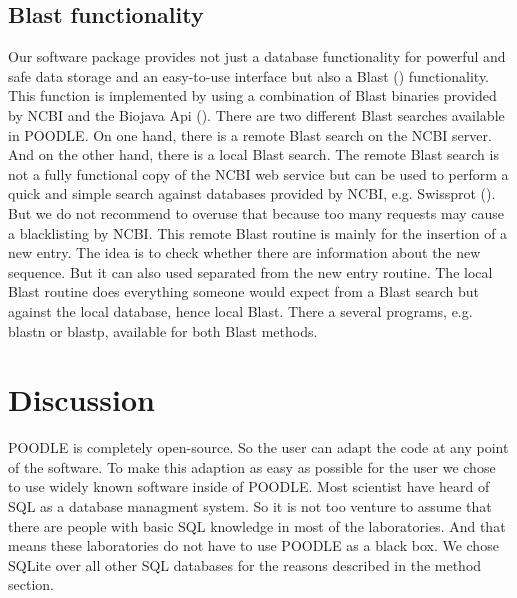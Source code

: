 \documentclass{bioinfo}
\begin{document}
\begin{methods}
\subsection{Blast functionality}

Our software package provides not just a database functionality for powerful and safe data storage 
and an easy-to-use interface but also a Blast (\citealp{Altschul01}) functionality. This function 
is implemented by using a combination of Blast binaries provided by NCBI and the Biojava Api 
(\citealp{Prlic01}). There are two different Blast searches available in POODLE. On one hand, there 
is a remote Blast search on the NCBI server. And on the other hand, there is a local Blast search. 
The remote Blast search is not a fully functional copy of the NCBI web service but can be used to 
perform a quick and simple search against databases provided by NCBI, e.g. Swissprot (\citealp{Donavan01}). But we 
do not recommend to overuse that because too many requests may cause a blacklisting by NCBI. This 
remote Blast routine is mainly for the insertion of a new entry. The idea is to check whether there 
are information about the new sequence. But it can also used separated from the new entry routine. 
The local Blast routine does everything someone would 
expect from a Blast search but against the local database, hence local Blast. There a several programs, 
e.g. blastn or blastp, available for both Blast methods. 

\end{methods}




\section{Discussion}

POODLE is completely open-source. So the user can adapt the code at any point of the software. To make 
this adaption as easy as possible for the user we chose to use widely known software inside of POODLE. 
Most scientist have heard of SQL as a database managment system. So it is not too venture to assume 
that there are people with basic SQL knowledge in most of the laboratories. And that means these 
laboratories do not have to use POODLE as a black box. We chose SQLite over all other SQL databases 
for the reasons described in the method section. 
\end{document}
